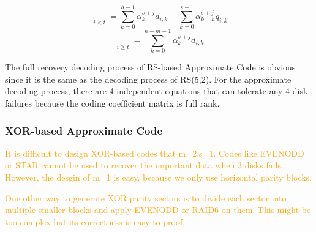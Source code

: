 \documentclass[sigconf]{acmart}
\begin{document}
\begin{equation}\label{p_ij_1}
    \mathop{p_{i,j}}\limits_{i<t} = 
    \sum_{k=0}^{h-1} \alpha_k^{s+j} d_{i,k} +
    \sum_{k=0}^{s-1} \alpha_{k+h}^{s+j} q_{i,k}
\end{equation}
\begin{equation}\label{p_ij_2}
    \mathop{p_{i,j}}\limits_{i \geqslant t} = 
    \sum_{k=0}^{n-m-1} \alpha_k^{s+j} d_{i,k}
\end{equation}

The full recovery decoding process of RS-based Approximate Code is obvious since it is the same as the decoding process of RS(5,2).
For the approximate decoding process, there are 4 independent equations that can tolerate any 4 disk failures because the coding coefficient matrix is full rank.

\subsubsection{ XOR-based Approximate Code}
\textcolor{orange}{It is difficult to design XOR-based codes that m=2,s=1. Codes like EVENODD or STAR cannot be used to recover the important data when 3 disks fails. However, the desgin of m=1 is easy, because we only use horizontal parity blocks. }

\textcolor{orange}{One other way to generate XOR parity sectors is to divide each sector into multiple smaller blocks and apply EVENODD or RAID6 on them. This might be too complex but its correctness is easy to proof.}
\end{document}
